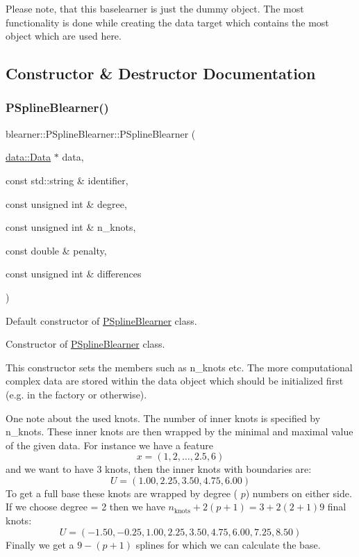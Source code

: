 Please note, that this baselearner is just the dummy object. The most functionality is done while creating the data target which contains the most object which are used here. 

\subsection{Constructor \& Destructor Documentation}
\mbox{\label{classblearner_1_1_p_spline_blearner_aceffa2bd25f0d8ff728cb7c6eb084809}} 
\subsubsection{\texorpdfstring{P\+Spline\+Blearner()}{PSplineBlearner()}}
{\footnotesize\ttfamily blearner\+::\+P\+Spline\+Blearner\+::\+P\+Spline\+Blearner (\begin{DoxyParamCaption}\item[{\hyperlink{classdata_1_1_data}{data\+::\+Data} $\ast$}]{data,  }\item[{const std\+::string \&}]{identifier,  }\item[{const unsigned int \&}]{degree,  }\item[{const unsigned int \&}]{n\+\_\+knots,  }\item[{const double \&}]{penalty,  }\item[{const unsigned int \&}]{differences }\end{DoxyParamCaption})}



Default constructor of {\ttfamily \hyperlink{classblearner_1_1_p_spline_blearner}{P\+Spline\+Blearner}} class. 

Constructor of {\ttfamily \hyperlink{classblearner_1_1_p_spline_blearner}{P\+Spline\+Blearner}} class.

This constructor sets the members such as n\+\_\+knots etc. The more computational complex data are stored within the data object which should be initialized first (e.\+g. in the factory or otherwise).

One note about the used knots. The number of inner knots is specified by {\ttfamily n\+\_\+knots}. These inner knots are then wrapped by the minimal and maximal value of the given data. For instance we have a feature \[ x = (1, 2, \dots, 2.5, 6) \] and we want to have 3 knots, then the inner knots with boundaries are\+: \[ U = (1.00, 2.25, 3.50, 4.75, 6.00) \] To get a full base these knots are wrapped by {\ttfamily degree} ( $p$) numbers on either side. If we choose {\ttfamily degree = 2} then we have $n_\mathrm{knots} + 2(p + 1) = 3 + 2(2 + 1) 9$ final knots\+: \[ U = (-1.50, -0.25, 1.00, 2.25, 3.50, 4.75, 6.00, 7.25, 8.50) \] Finally we get a $9 - (p + 1)$ splines for which we can calculate the base.


